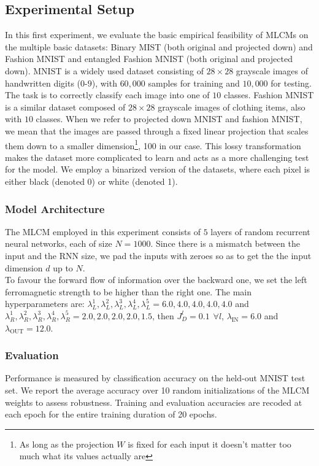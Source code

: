 \documentclass[a4paper,12pt]{report}
\begin{document}
\subsection{Experimental Setup}
In this first experiment, we evaluate the basic empirical feasibility of MLCMs on 
the multiple basic datasets: Binary MIST (both original and projected down) and 
Fashion MNIST and entangled Fashion MNIST (both original and projected down). 
MNIST is a widely used dataset consisting of $28 \times 28$ grayscale images of 
handwritten digits ($0$-$9$), with $60,\!000$ samples for training and $10,\!000$ 
for testing. The task is to correctly classify each image into 
one of $10$ classes. Fashion MNIST is a similar dataset composed of $28 \times 28$ 
grayscale images of clothing items, also with $10$ classes. When we refer to 
projected down MNIST and fashion MNIST, we mean that the images are passed through 
a fixed linear projection that scales them down to a smaller dimension\footnote{As 
long as the projection $W$ is fixed for each input it doesn't matter too much what 
its values actually are}, 100 in our 
case. This lossy transformation makes the dataset more complicated to learn and 
acts as a more challenging test for the model. 
We employ a binarized version of the datasets, where each pixel is either black 
(denoted 0) or white (denoted 1).
%
\subsubsection*{Model Architecture}
The MLCM employed in this experiment consists of $5$ layers of random recurrent 
neural networks, each of size $N=1000$. Since there is a mismatch between the 
input and the RNN size, we pad the inputs with zeroes so as to get the 
the input dimension $d$ up to $N$. \\
To favour the forward flow of information over the backward one, we set the left 
ferromagnetic strength to be higher than the right one. The main 
hyperparameters are: $\lambda^1_L, \lambda^2_L, \lambda^3_L, \lambda^4_L, 
\lambda^5_L = 6.0, 4.0, 4.0, 4.0, 4.0$ and $\lambda^1_R, \lambda^2_R, \lambda^3_R, 
\lambda^4_R, \lambda^5_R = 2.0, 2.0, 2.0, 2.0, 1.5$, then $J_D^l = 0.1 \hspace{5pt} 
\forall l$, $\lambda_{\mathrm{IN}} = 6.0$ and $\lambda_{\mathrm{OUT}} = 12.0$.
%
\subsubsection*{Evaluation}
Performance is measured by classification accuracy on the held-out MNIST test set. 
We report the average accuracy over 10 random initializations of the MLCM weights to 
assess robustness. Training and evaluation accuracies are recoded at each epoch 
for the entire training duration of 20 epochs.
%
\end{document}
